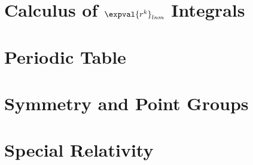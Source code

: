 \documentclass[a4paper, 11pt]{book}
\begin{document}
	\chapter{Calculus of $\expval{r^k}_{lnm}$ Integrals}
		
	\chapter{Periodic Table}\label{app:E}
		
%		
	\chapter{Symmetry and Point Groups}\label{app:groups}
		
	\chapter{Special Relativity}
		
		
		
\nocite{quantistica,landau3,statistica,struttura,struttura1,griffmq,sakuraimqm,patritesta,molekulphysik,complessa,griffpart,nucleare,relativitat,relativita,pdg,griffpart,thermoditt}
\printbibliography
\end{document}
